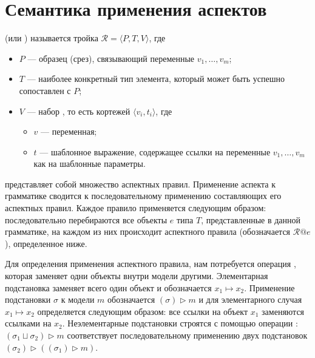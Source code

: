 \section{Семантика применения аспектов}

\begin{Def}
 (или ) называется тройка
$\mathcal{R} = \langle P, T, V \rangle$, где
\begin{itemize}
\item $P$ --- образец (срез), связывающий переменные $v_1,\ldots,v_m$;
\item $T$ --- наиболее конкретный тип элемента, который может быть успешно сопоставлен с $P$;
\item $V$ --- набор , то есть кортежей $\langle v_i, t_i \rangle$, где
	\begin{itemize}
		\item $v$ --- переменная;
		\item $t$ --- шаблонное выражение, содержащее ссылки на переменные $v_1,\ldots,v_m$ как на шаблонные параметры.
	\end{itemize}
\end{itemize}
\end{Def}
\newcommand{\rapply}[2]{#1@#2}
 представляет собой множество аспектных правил. Применение аспекта к грамматике сводится к последовательному применению составляющих его аспектных правил. Каждое правило применяется следующим образом: последовательно перебираются все объекты $e$ типа $T$, представленные в данной грамматике, на каждом из них происходит  аспектного правила (обозначается $\rapply{\mathcal{R}}{e}$), определенное ниже.

\newcommand{\subst}[2]{ #1 \mapsto #2 }
\newcommand{\apply}[2]{\left( #1 \right) \triangleright #2}
Для определения применения аспектного правила, нам потребуется операция , которая заменяет одни объекты внутри модели другими. Элементарная подстановка заменяет всего один объект и обозначается $\subst{x_1}{x_2}$. Применение подстановки $\sigma$ к модели $m$ обозначается $\apply{\sigma}{m}$ и для элементарного случая $\subst{x_1}{x_2}$ определяется следующим образом: все ссылки на объект $x_1$ заменяются ссылками на $x_2$.
Неэлементарные подстановки строятся с помощью операции : $\apply{\sigma_1 \sqcup \sigma_2}{m}$ соответствует последовательному применению двух подстановок $\apply{\sigma_2}{\left( \apply{\sigma_1}{m} \right)}$.

